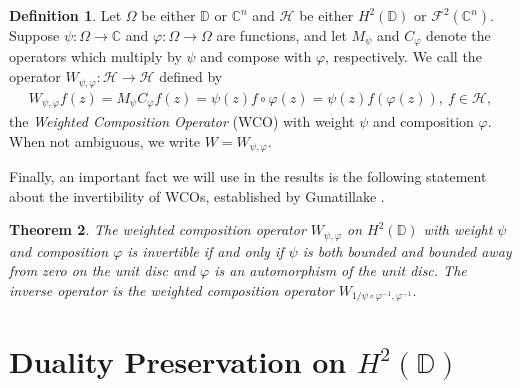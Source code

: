 \documentclass{amsart}
\newtheorem{thm}{Theorem}[section]
\theoremstyle{definition}
\newtheorem{definition}[thm]{Definition}
\theoremstyle{remark}
\numberwithin{equation}{section}
\newcommand{\D}{\mathbb{D}} %
\begin{document}
\begin{definition}
Let $\Omega$ be either $\mathbb{D}$ or $\mathbb{C}^{n}$ and $\mathcal{H}$ be either $H^2(\mathbb{D})$ or $\mathcal{F}^2(\mathbb{C}^n)$. Suppose $\psi:\Omega\to\mathbb{C}$ and $\varphi:\Omega\to\Omega$ are functions, and let $M_{\psi}$ and $C_{\varphi}$ denote the operators which multiply by $\psi$ and compose with $\varphi$, respectively. We call the operator $W_{\psi,\varphi}: \mathcal{H} \to \mathcal{H}$ defined by
\begin{align*}
    W_{\psi,\varphi}f(z)=M_{\psi}C_{\varphi}f(z)=\psi(z)f\circ\varphi(z) = \psi(z)f(\varphi(z)), \ f \in \mathcal{H},
\end{align*}
the \emph{Weighted Composition Operator} (WCO) with weight $\psi$ and composition $\varphi$. When not ambiguous, we write $W=W_{\psi,\varphi}$. 
\end{definition}
Finally, an important fact we will use in the results is the following statement about the invertibility of WCOs, established by Gunatillake \cite{gunatillake2011invertible}.
\begin{thm}\cite[Theorem 2.0.1]{gunatillake2011invertible}\label{thm:Gunatillake} The weighted composition operator $W_{\psi,\varphi}$ on $H^2(\D)$ with weight $\psi$ and composition $\varphi$ is invertible if and only if $\psi$ is both bounded and bounded away from zero on the unit disc and $\varphi$ is an automorphism of the unit disc. The inverse operator is the weighted composition operator $W_{1/\psi \circ \varphi^{-1},\varphi^{-1}}.$
    
\end{thm}




\section{Duality Preservation on \texorpdfstring{$H^{2}(\mathbb{D})$}{H²(D)}}\label{sec:dualpreservation_Hardy}
\end{document}
